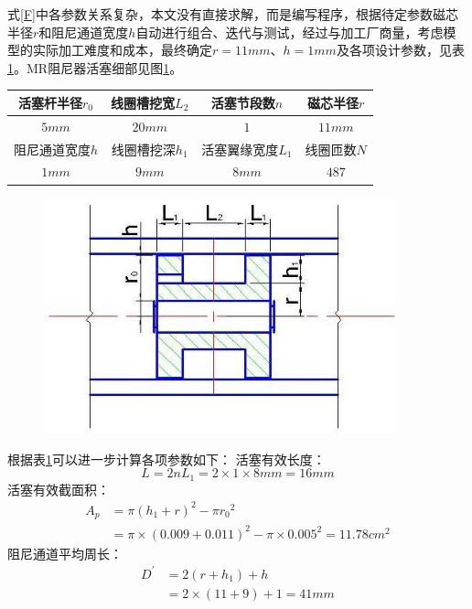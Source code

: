 式\eqref{F}中各参数关系复杂，本文没有直接求解，而是编写程序，根据待定参数磁芯半径$r$和阻尼通道宽度$h$自动进行组合、迭代与测试，经过与加工厂商量，考虑模型的实际加工难度和成本，最终确定$r=11mm$、$h=1mm$及各项设计参数，见表\ref{element}。MR阻尼器活塞细部见图\ref{detail}。

\begin{table}[H]
\centering
{}
\label{element}
\footnotesize
\begin{tabular}{|c|c|c|c|}
\hline 活塞杆半径$r_0$ & 线圈槽挖宽$L_2$ & 活塞节段数$n$ & 磁芯半径$r$ \\
\hline $5mm$ & $20mm$ & $1$ & $11mm$ \\
\hline 阻尼通道宽度$h$ & 线圈槽挖深$h_1$ & 活塞翼缘宽度$L_1$ & 线圈匝数$N$ \\
\hline $1mm$ & $9mm$ & $8mm$ & $487$ \\
\hline

\end{tabular}
\end{table}

\begin{figure}[htb]
	\centering
	\label{detail}
	\includegraphics[width=4in]{figure/detail}
\end{figure}

根据表\ref{element}可以进一步计算各项参数如下：
活塞有效长度：
\begin{equation}
L=2nL_1=2\times1\times8mm=16mm
\end{equation}
活塞有效截面积：
\begin{equation}
\begin{split}
A_p&=\pi\left(h_1+r\right)^2-\pi r{_0}{^2}\\&=\pi\times\left(0.009+0.011\right)^2-\pi\times0.005^2=11.78cm^2
\end{split}
\end{equation}
阻尼通道平均周长：
\begin{equation}
\begin{split}
D^{'}&=2\left(r+h_1\right)+h\\&=2\times\left(11+9\right)+1=41mm
\end{split}
\end{equation}

